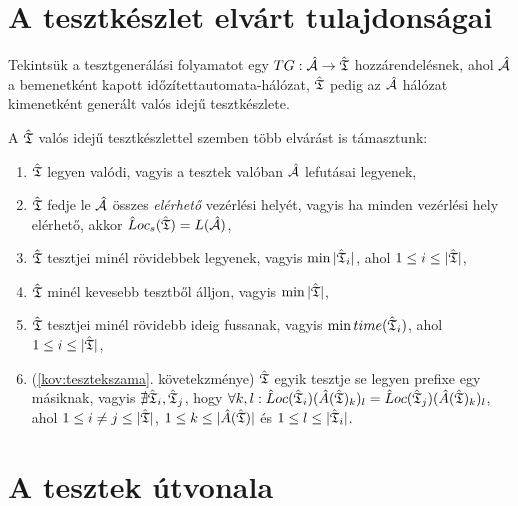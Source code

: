\section{A tesztkészlet elvárt tulajdonságai} \label{kovetelmenyek}

Tekintsük a tesztgenerálási folyamatot egy $TG: \hat{\mathcal{A}} \rightarrow \hat{\mathfrak{T}}$ hozzárendelésnek, ahol $\hat{\mathcal{A}}$ a bemenetként kapott időzítettautomata-hálózat, $\hat{\mathfrak{T}}$ pedig az $\hat{\mathcal{A}}$ hálózat kimenetként generált valós idejű tesztkészlete.

A $\hat{\mathfrak{T}}$ valós idejű tesztkészlettel szemben több elvárást is támasztunk:

\begin{enumerate}
    \item \label{kov:valodi} $\hat{\mathfrak{T}}$ legyen valódi, vagyis a tesztek valóban $\hat{\mathcal{A}}$ lefutásai legyenek,
    \item \label{kov:fedes} $\hat{\mathfrak{T}}$ fedje le $\hat{\mathcal{A}}$ összes \emph{elérhető} vezérlési helyét, vagyis ha minden vezérlési hely elérhető, akkor $\hat{L}oc_s(\hat{\mathfrak{T}}) = L(\hat{\mathcal{A}})$,
    \item \label{kov:tesztekhossza} $\hat{\mathfrak{T}}$ tesztjei minél rövidebbek legyenek, vagyis $\min |\hat{\mathfrak{T}}_i|$, ahol $1 \leq i \leq |\hat{\mathfrak{T}}|$,
    \item \label{kov:tesztekszama} $\hat{\mathfrak{T}}$ minél kevesebb tesztből álljon, vagyis $\min |\hat{\mathfrak{T}}|$,
    \item \label{kov:tesztekideje} $\hat{\mathfrak{T}}$ tesztjei minél rövidebb ideig fussanak, vagyis $\min time(\hat{\mathfrak{T}}_i)$, ahol $1 \leq i \leq |\hat{\mathfrak{T}}|$,
    \item \label{kov:prefixteszt} (\ref{kov:tesztekszama}. követekzménye) $\hat{\mathfrak{T}}$ egyik tesztje se legyen prefixe egy másiknak, vagyis $\nexists \hat{\mathfrak{T}}_i, \hat{\mathfrak{T}}_j$, hogy $\forall k, l: \hat{L}oc(\hat{\mathfrak{T}}_i)(\hat{A}(\hat{\mathfrak{T}})_k)_l = \hat{L}oc(\hat{\mathfrak{T}}_j)(\hat{A}(\hat{\mathfrak{T}})_k)_l$, ahol $1 \leq i \neq j \leq |\hat{\mathfrak{T}}|$, $1 \leq k \leq |\hat{A}(\hat{\mathfrak{T}})|$ és $1 \leq l \leq |\hat{\mathfrak{T}}_i|$.
\end{enumerate}

\section{A tesztek útvonala} \label{teszt-utvonal}

